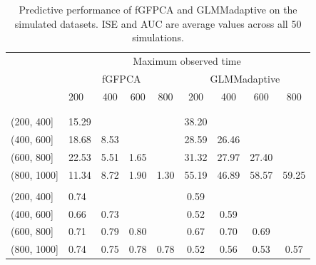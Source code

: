 \documentclass[
  11pt,
]{article}
\begin{document}
\begin{table}

\caption{\label{tab:format table}Predictive performance of fGFPCA and GLMMadaptive on the simulated datasets. ISE and AUC are average values across all 50 simulations.}
\centering
\begin{tabular}[t]{llccccccc}
\toprule
\multicolumn{1}{c}{ } & \multicolumn{8}{c}{Maximum observed time} \\
\cmidrule(l{3pt}r{3pt}){2-9}
\multicolumn{1}{c}{ } & \multicolumn{4}{c}{fGFPCA} & \multicolumn{4}{c}{GLMMadaptive} \\
\cmidrule(l{3pt}r{3pt}){2-5} \cmidrule(l{3pt}r{3pt}){6-9}
  & 200 & 400 & 600 & 800 & 200 & 400 & 600 & 800\\
\midrule
\addlinespace[0.3em]
\multicolumn{9}{l}{\textbf{Prediction time window}}\\
\addlinespace[0.3em]
\multicolumn{9}{l}{\textbf{ISE}}\\
\hspace{1em}\hspace{1em}(200, 400] & 15.29 &  &  &  & 38.20 &  &  & \\
\hspace{1em}\hspace{1em}(400, 600] & 18.68 & 8.53 &  &  & 28.59 & 26.46 &  & \\
\hspace{1em}\hspace{1em}(600, 800] & 22.53 & 5.51 & 1.65 &  & 31.32 & 27.97 & 27.40 & \\
\hspace{1em}\hspace{1em}(800, 1000] & 11.34 & 8.72 & 1.90 & 1.30 & 55.19 & 46.89 & 58.57 & 59.25\\
\addlinespace[0.3em]
\multicolumn{9}{l}{\textbf{AUC}}\\
\hspace{1em}\hspace{1em}(200, 400] & 0.74 &  &  &  & 0.59 &  &  & \\
\hspace{1em}\hspace{1em}(400, 600] & 0.66 & 0.73 &  &  & 0.52 & 0.59 &  & \\
\hspace{1em}\hspace{1em}(600, 800] & 0.71 & 0.79 & 0.80 &  & 0.67 & 0.70 & 0.69 & \\
\hspace{1em}\hspace{1em}(800, 1000] & 0.74 & 0.75 & 0.78 & 0.78 & 0.52 & 0.56 & 0.53 & 0.57\\
\bottomrule
\end{tabular}
\end{table}
\end{document}
